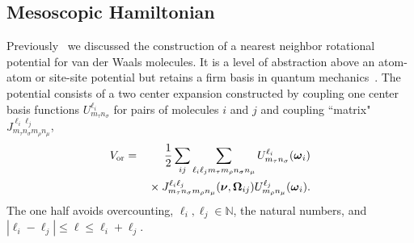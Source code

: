\documentclass[preprint]{revtex4}
\newcommand{\mb}[1]{\ensuremath{\mbox{\boldmath $ #1 $}}}
\begin{document}

\subsection{Mesoscopic Hamiltonian}
\label{hamiltonian}

Previously~\cite{Mettes04} we discussed the construction of a
nearest neighbor rotational potential for van der Waals molecules.
It is a level of abstraction above an atom-atom or site-site
potential but retains a firm basis in quantum
mechanics~\cite{Avoird94}. The potential consists of a two center
expansion constructed by coupling one center basis functions
$U^{\ell_i}_{m_\tau n_\sigma}$ for pairs of molecules $i$ and $j$
and coupling ``matrix" $J_{m_\tau n_\sigma m_\rho n_\mu}^{\ell_i
\ell_j}$,
\begin{eqnarray}
\label{re:eq:vij2}V_{\mathrm{or}} &=&
\frac{1}{2}\sum_{ij}\sum_{\ell_i\ell_j m_\tau m_\rho n_\sigma n_\mu}
U^{\ell_i}_{m_\tau n_\sigma}(\mb{\omega}_i)\nonumber\\
&&{}\times J_{m_\tau n_\sigma m_\rho n_\mu}^{\ell_i
\ell_j}(\mb{\nu},\mb{\Omega}_{ij})U^{\ell_j}_{m_\rho
n_\mu}(\mb{\omega}_i).
\end{eqnarray}
The one half avoids overcounting, $\ell_i,\ell_j\in\mathbb{N}$, the
natural numbers, and $|\ell_i-\ell_j|\leq\ell\leq \ell_i+\ell_j$.
\end{document}
